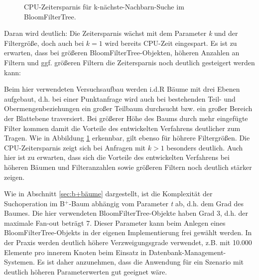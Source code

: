 \begin{figure}[hpbt]
  \hspace{0.01\textwidth}
 \caption[CPU-Zeitersparnis für k-nächste-Nachbarn-Suche im BloomFilterTree]{CPU-Zeitersparnis für k-nächste-Nachbarn-Suche im BloomFilterTree.}
 \label{fig:multipic1} %
\end{figure}
Daran wird deutlich: Die Zeitersparnis wächst mit dem Parameter \textit{k} und der Filtergröße, doch auch bei $k=1$ wird bereits CPU-Zeit eingespart. Es ist zu erwarten, dass bei größeren BloomFilterTree-Objekten, höheren Anzahlen an Filtern und ggf. größeren Filtern die Zeitersparnis noch deutlich gesteigert werden kann: 

Beim hier verwendeten Versuchsaufbau werden i.d.R Bäume mit drei Ebenen aufgebaut, d.h. bei einer Punktanfrage wird auch bei bestehenden Teil- und Obermengenbeziehungen ein großer Teilbaum durchsucht bzw. ein großer Bereich der Blattebene traversiert. Bei größerer Höhe des Baums durch mehr eingefügte Filter kommen damit die Vorteile des entwickelten Verfahrens deutlicher zum Tragen. Wie in Abbildung \ref{fig:multipic1} erkennbar, gilt ebenso für höhrere Filtergrößen. Die CPU-Zeitersparnis zeigt sich bei Anfragen mit $k>1$ besonders deutlich. Auch hier ist zu erwarten, dass sich die Vorteile des entwickelten Verfahrens bei höheren Bäumen und Filteranzahlen sowie größeren Filtern noch deutlich stärker zeigen.

Wie in Abschnitt \ref{sec:b+bäume} dargestellt, ist die Komplexität der Suchoperation im B$^+$-Baum abhängig vom Parameter \textit{t} ab, d.h. dem Grad des Baumes. Die hier verwendeten BloomFilterTree-Objekte haben Grad 3, d.h. der maximale Fan-out beträgt 7. Dieser Parameter kann beim Anlegen eines BloomFilterTree-Objekts in der eigenen Implementierung frei gewählt werden. In der Praxis werden deutlich höhere Verzweigungsgrade verwendet, z.B. mit 10.000 Elemente pro innerem Knoten beim Einsatz in Datenbank-Management-Systemen. Es ist daher anzunehmen, dass die Anwendung für ein Szenario mit deutlich höheren Parameterwerten gut geeignet wäre. 

